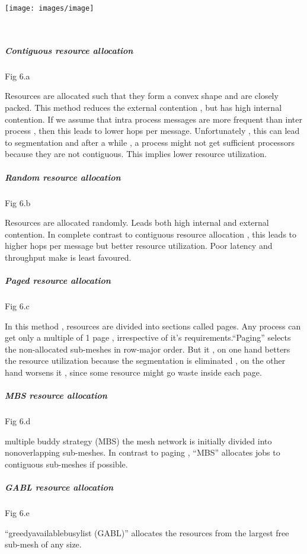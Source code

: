 \texttt{[image: images/image]}%

\ \\


\subparagraph{Contiguous resource allocation}

Fig 6.a

Resources are allocated such that they form a convex shape and are
closely packed. This method reduces the external contention , but
has high internal contention. If we assume that intra process messages
are more frequent than inter process , then this leads to lower hops
per message. Unfortunately , this can lead to segmentation and after
a while , a process might not get sufficient processors because they
are not contiguous. This implies lower resource utilization.


\subparagraph{Random resource allocation}

Fig 6.b

Resources are allocated randomly. Leads both high internal and external
contention. In complete contrast to contiguous resource allocation
, this leads to higher hops per message but better resource utilization.
Poor latency and throughput make is least favoured.


\subparagraph{Paged resource allocation}

Fig 6.c

In this method , resources are divided into sections called pages.
Any process can get only a multiple of 1 page , irrespective of it's
requirements.\textquotedblleft{}Paging\textquotedblright{} selects
the non-allocated sub-meshes in row-major order. But it , on one hand
betters the resource utilization because the segmentation is eliminated
, on the other hand worsens it , since some resource might go waste
inside each page. 


\subparagraph{MBS resource allocation}

Fig 6.d

multiple buddy strategy (MBS) the mesh network is initially divided
into nonoverlapping sub-meshes. In contrast to paging , \textquotedblleft{}MBS\textquotedblright{}
allocates jobs to contiguous sub-meshes if possible.


\subparagraph{GABL resource allocation}

Fig 6.e

\textquotedblleft{}greedy\textendash{}available\textendash{}busy\textendash{}list
(GABL)\textquotedblright{} allocates the resources from the largest
free sub-mesh of any size. 


